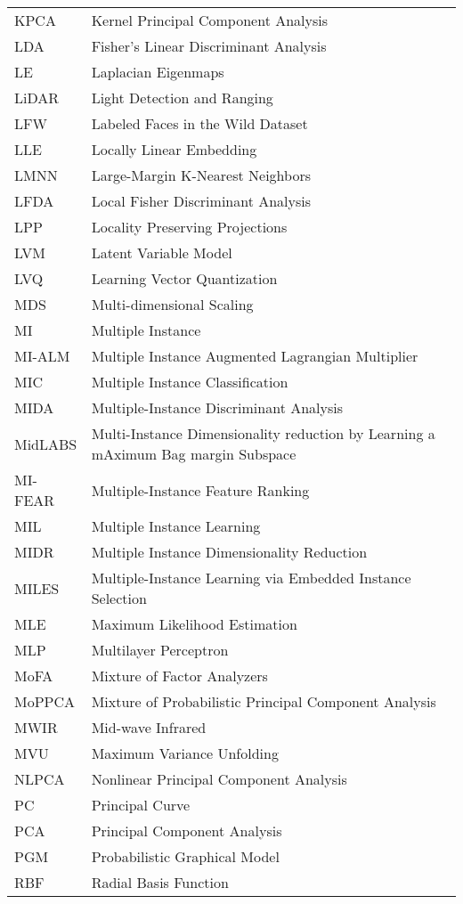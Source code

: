 \begin{longtable}{l p{5in}}
KPCA & Kernel Principal Component Analysis\\
LDA & Fisher's Linear Discriminant Analysis\\
LE & Laplacian Eigenmaps\\
LiDAR & Light Detection and Ranging\\
LFW & Labeled Faces in the Wild Dataset\\
LLE & Locally Linear Embedding\\
LMNN & Large-Margin K-Nearest Neighbors\\
LFDA & Local Fisher Discriminant Analysis\\
LPP & Locality Preserving Projections\\
LVM & Latent Variable Model\\
LVQ & Learning Vector Quantization\\
MDS & Multi-dimensional Scaling\\
MI & Multiple Instance\\
MI-ALM & Multiple Instance Augmented Lagrangian Multiplier\\
MIC & Multiple Instance Classification\\
MIDA & Multiple-Instance Discriminant Analysis\\
MidLABS & Multi-Instance Dimensionality reduction by Learning a mAximum Bag margin Subspace\\
MI-FEAR & Multiple-Instance Feature Ranking\\
MIL & Multiple Instance Learning\\
MIDR & Multiple Instance Dimensionality Reduction\\
MILES & Multiple-Instance Learning via Embedded Instance Selection\\
MLE & Maximum Likelihood Estimation\\
MLP & Multilayer Perceptron\\
MoFA & Mixture of Factor Analyzers\\
MoPPCA & Mixture of Probabilistic Principal Component Analysis\\
MWIR & Mid-wave Infrared\\
MVU & Maximum Variance Unfolding\\
NLPCA & Nonlinear Principal Component Analysis\\
PC & Principal Curve\\
PCA & Principal Component Analysis\\
PGM & Probabilistic Graphical Model\\
RBF & Radial Basis Function\\

\end{longtable}

